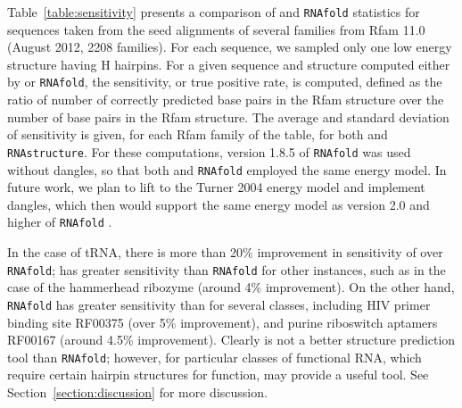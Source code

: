 Table~\ref{table:sensitivity} presents a comparison of {\rnahairpin}
and {\tt RNAfold} statistics for sequences taken from the seed alignments
of several families from Rfam 11.0 \cite{Burge.nar13}
(August 2012, 2208 families).  For each sequence,
we sampled only one low energy structure having H hairpins. For a given
sequence and structure computed either by {\rnahairpin} or {\tt RNAfold},
the sensitivity, or true positive rate, is computed, defined as
the ratio of number of correctly predicted base pairs in the
Rfam structure over the number of base pairs in the Rfam structure.
The average and standard deviation of sensitivity is given, for each
Rfam family of the table, for both {\rnahairpin} and {\tt RNAstructure}.
For these computations, version 1.8.5 of {\tt RNAfold} was used without
dangles, so that both {\rnahairpin} and {\tt RNAfold} employed the same
energy model. In future work, we plan to lift {\rnahairpin} to
the Turner 2004 energy model and implement dangles, which then would
support the same energy model as version 2.0 and higher of
{\tt RNAfold} \cite{Lorenz.amb11}.


In the case of tRNA, there is more than 20\% improvement in sensitivity
of {\rnahairpin} over {\tt RNAfold}; {\rnahairpin} has greater sensitivity
than {\tt RNAfold} for other instances, such as
in the case of the hammerhead ribozyme (around 4\% improvement).
On the other hand, {\tt RNAfold} has greater
sensitivity than {\rnahairpin} for several classes, including
HIV primer binding site RF00375 (over 5\% improvement), and
purine riboswitch aptamers RF00167 (around 4.5\% improvement).
Clearly {\rnahairpin} is not a better structure prediction tool than
{\tt RNAfold}; however, for particular classes of functional RNA,
which require certain hairpin structures for function, {\rnahairpin}
may provide a useful tool. See Section~\ref{section:discussion} for
more discussion.

